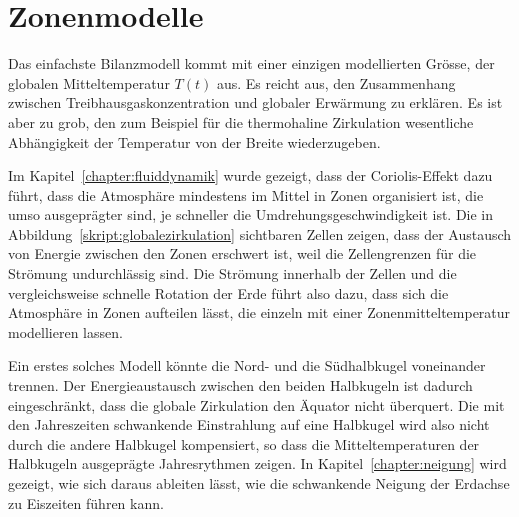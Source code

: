 %
%
%
\section{Zonenmodelle}
Das einfachste Bilanzmodell kommt mit einer einzigen modellierten
Grösse, der globalen Mitteltemperatur $T(t)$ aus.
Es reicht aus, den Zusammenhang zwischen Treibhausgaskonzentration
und globaler Erwärmung zu erklären.
Es ist aber zu grob, den zum Beispiel für die thermohaline Zirkulation
wesentliche Abhängigkeit der Temperatur von der Breite wiederzugeben.

Im Kapitel~\ref{chapter:fluiddynamik} wurde gezeigt, dass der
Coriolis-Effekt dazu führt, dass die Atmosphäre mindestens im Mittel
in Zonen organisiert ist, die umso ausgeprägter sind, je schneller
die Umdrehungsgeschwindigkeit ist.
Die in Abbildung~\ref{skript:globalezirkulation} sichtbaren Zellen
zeigen, dass der Austausch von Energie zwischen den Zonen erschwert
ist, weil die Zellengrenzen für die Strömung undurchlässig sind.
Die Strömung innerhalb der Zellen und die vergleichsweise schnelle
Rotation der Erde führt also dazu, dass sich die Atmosphäre in
Zonen aufteilen lässt, die einzeln mit einer Zonenmitteltemperatur
modellieren lassen.

Ein erstes solches Modell könnte die Nord- und die Südhalbkugel voneinander
trennen.
Der Energieaustausch zwischen den beiden Halbkugeln ist dadurch 
eingeschränkt, dass die globale Zirkulation den Äquator nicht überquert.
Die mit den Jahreszeiten schwankende Einstrahlung auf eine Halbkugel
wird also nicht durch die andere Halbkugel kompensiert, so dass die
Mitteltemperaturen der Halbkugeln ausgeprägte Jahresrythmen zeigen.
In Kapitel~\ref{chapter:neigung} wird gezeigt, wie sich daraus ableiten
lässt, wie die schwankende Neigung der Erdachse zu Eiszeiten führen kann.

